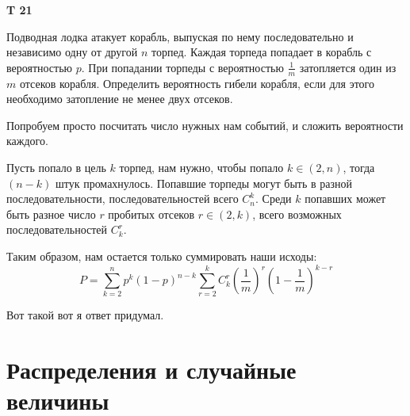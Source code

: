 \documentclass[a4paper,12pt]{article} %
\begin{document}
\begin{example}\textbf{T 21}

Подводная лодка атакует корабль, выпуская по нему последовательно и независимо одну от другой $n$ торпед. 
Каждая торпеда попадает в корабль с вероятностью $p .$ 
При попадании торпеды с вероятностью $\frac{1}{m}$ затопляется один из $m$ отсеков корабля. 
Определить вероятность гибели корабля, если для этого необходимо затопление не менее двух отсеков.


Попробуем просто посчитать число нужных нам событий, и сложить вероятности каждого.

Пусть попало в цель $k$ торпед, нам нужно, чтобы попало $ k\in (2,n)$,  тогда $ (n-k)$ штук промахнулось. Попавшие торпеды могут быть в разной последовательности, последовательностей всего $ C_n^k $.
Среди $k$ попавших может быть разное число $r$ пробитых отсеков $ r\in (2,k) $, всего возможных последовательностей $C_k^r$.

Таким образом, нам остается только суммировать наши исходы:
\[ P=\sum_{k=2}^{n}p^k(1-p)^{n-k}\sum_{r=2}^{k} C_k^r \left(\frac{1}{m}\right)^r 
\left(1-\frac{1}{m}\right)^{k-r}\]

Вот такой вот я ответ придумал.


\end{example}






\section{Распределения и случайные величины}
\end{document}
